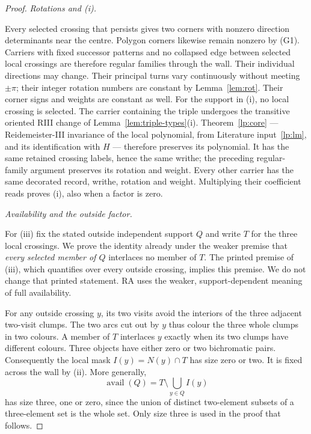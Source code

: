 \begin{proof}
\par\medskip\noindent\emph{Rotations and (i).}\par
Every selected crossing that persists gives two corners with nonzero
direction determinants near the centre. Polygon corners likewise
remain nonzero by (G1). Carriers with fixed successor patterns and no
collapsed edge between selected local crossings are therefore regular
families through the wall. Their individual directions may change.
Their principal turns vary continuously without meeting $\pm\pi$;
their integer rotation numbers are constant by Lemma~\ref{lem:rot}.
Their corner signs and weights are constant as well.
For the support in (i), no local crossing is selected. The carrier
containing the triple undergoes the transitive oriented RIII change
of Lemma~\ref{lem:triple-types}(i). Theorem~\ref{lp:core} --- Reidemeister-III
invariance of the local polynomial, from Literature input~\ref{lp:lm}, and its
identification with $H$ --- therefore preserves its polynomial. It has the same retained crossing
labels, hence the same writhe; the preceding regular-family argument
preserves its rotation and weight. Every other carrier has the same
decorated record, writhe, rotation and weight. Multiplying their
coefficient reads proves (i), also when a factor is zero.

\par\medskip\noindent\emph{Availability and the outside factor.}\par
For (iii) fix the stated outside independent support $Q$ and write
$T$ for the three local crossings. We prove the identity already under
the weaker premise that \emph{every selected member of $Q$} interlaces
no member of $T$. The printed premise of (iii), which quantifies over
every outside crossing, implies this premise. We do not change that
printed statement. RA uses the weaker, support-dependent meaning of
full availability.

For any outside crossing $y$, its two visits avoid the interiors of
the three adjacent two-visit clumps. The two arcs cut out by $y$ thus
colour the three whole clumps in two colours. A member of $T$
interlaces $y$ exactly when its two clumps have different colours.
Three objects have either zero or two bichromatic pairs. Consequently
the local mask $I(y)=N(y)\cap T$ has size zero or two. It is fixed
across the wall by (ii). More generally,
\[
 \operatorname{avail}(Q)=T\setminus\bigcup_{y\in Q}I(y)
\]
has size three, one or zero, since the union of distinct two-element
subsets of a three-element set is the whole set. Only size three is
used in the proof that follows.


\end{proof}
